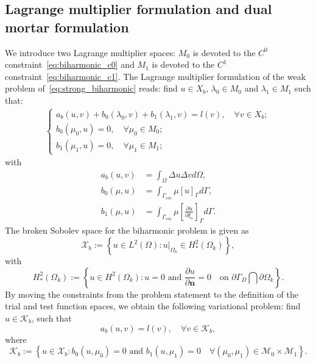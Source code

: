 \documentclass[preprint,12pt]{elsarticle}
\begin{document}
\subsection{Lagrange multiplier formulation and dual mortar formulation}
We introduce two Lagrange multiplier spaces: $M_0$ is devoted to the $C^0$ constraint~\eqref{eq:biharmonic_c0} and $M_1$ is devoted to the $C^1$ constraint~\eqref{eq:biharmonic_c1}. The Lagrange multiplier formulation of the weak problem of~\eqref{eq:strong_biharmonic} reads: find $u\in{X_b}$, $\lambda_0\in{M_0}$ and $\lambda_1\in{M_1}$ such that:
\begin{align}
    \begin{cases}
        a_b(u,v)+b_0(\lambda_0,v)+b_1(\lambda_1,v)=l(v),\quad\forall v\in{X_b};\\
        b_0(\mu_0,u)=0, \quad\forall \mu_0\in{M_0};\\
        b_1(\mu_1,u)=0, \quad\forall \mu_1\in{M_1};
    \end{cases}\label{eq:biharmonic_mixed}
\end{align}
with
\begin{align}
    a_b(u,v)&=\int_\Omega\Delta{u}\Delta{v}d\Omega,\\
    b_0(\mu,u)&=\int_{\Gamma_{sm}}\mu\left[u\right]_{\Gamma}d\Gamma,\\
    b_1(\mu,u)&=\int_{\Gamma_{sm}}\mu\left[\frac{\partial{u}}{\partial\xi_s}\right]_{\Gamma}d\Gamma.
\end{align}
The broken Sobolev space for the biharmonic problem is given as
\begin{equation}
    \mathcal{X}_b:=\left\{u\in{}L^2(\Omega): u\vert_{\Omega_k}\in{}H^2_*(\Omega_k)\right\},
\end{equation}
with 
\begin{equation}
    H^2_*(\Omega_k):=\left\{u\in{}H^2(\Omega_k): u=0 \text{ and }\frac{\partial{u}}{\partial{\mathbf{n}}}=0\quad\text{on } \partial\Gamma_D\bigcap\partial\Omega_k \right\}.
\end{equation}
By moving the constraints from the problem statement to the definition of the trial and test function spaces, we obtain the following variational problem: find $u\in{\mathcal{K}_b}$, such that
\begin{equation}
    a_b(u,v)=l(v), \quad\forall{v\in{\mathcal{K}_b}},\label{eq:biharmonic_kernel}
\end{equation}
where
\begin{equation}
    \mathcal{K}_b:=\left\{u\in{}\mathcal{X}_b: b_0(u, \mu_0)=0 \text{ and }b_1(u, \mu_1)=0\quad\forall(\mu_0,\mu_1)\in{\mathcal{M}_0\times{}\mathcal{M}_1}\right\}.\label{eq:biharmonic_reduced}
\end{equation}
\end{document}
